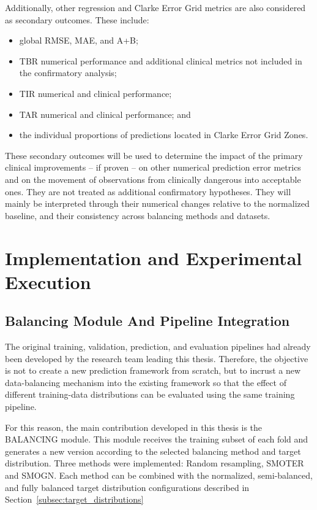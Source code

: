 Additionally, other regression and Clarke Error Grid metrics are also considered as secondary outcomes. These include:

\begin{itemize}
    \item global RMSE, MAE, and A+B;
    \item TBR numerical performance and additional clinical metrics not included in the confirmatory analysis;
    \item TIR numerical and clinical performance;
    \item TAR numerical and clinical performance; and
    \item the individual proportions of predictions located in Clarke Error Grid Zones.
\end{itemize}

These secondary outcomes will be used to determine the impact of the primary clinical improvements -- if proven -- on other numerical prediction error metrics and on the movement of observations from clinically dangerous into acceptable ones. They are not treated as additional confirmatory hypotheses. They will mainly be interpreted through their numerical changes relative to the normalized baseline, and their consistency across balancing methods and datasets.

\section{Implementation and Experimental Execution}
\label{sec:experimental_execution}

\subsection{Balancing Module And Pipeline Integration}
\label{subsec:balancing_implementation}

The original training, validation, prediction, and evaluation pipelines had already been developed by the research team leading this thesis. Therefore, the objective is not to create a new prediction framework from scratch, but to incrust a new data-balancing mechanism into the existing framework so that the effect of different training-data distributions can be evaluated using the same training pipeline.

For this reason, the main contribution developed in this thesis is the BALANCING module. This module receives the training subset of each fold and generates a new version according to the selected balancing method and target distribution. Three methods were implemented: Random resampling, SMOTER and SMOGN. Each method can be combined with the normalized, semi-balanced, and fully balanced target distribution configurations described in Section~\ref{subsec:target_distributions}

